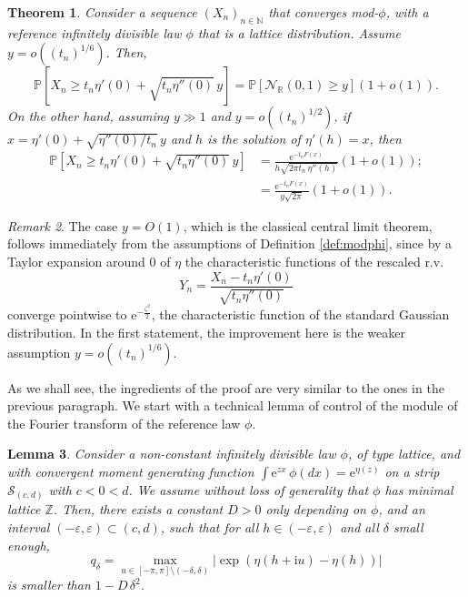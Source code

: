 \documentclass[12pt,a4paper,reqno]{amsart}
\newtheorem{lemma}{Lemma}[section]
\newtheorem{theorem}[lemma]{Theorem}
\theoremstyle{remark}
\newtheorem{remark}[lemma]{Remark}
\newcommand{\N}{\mathbb{N}}
\newcommand{\Z}{\mathbb{Z}}
\newcommand{\R}{\mathbb{R}}
\newcommand{\E}{\mathrm{e}}
\newcommand{\I}{\mathrm{i}}
\newcommand{\proba}{\mathbb{P}}
\newcommand{\eps}{\varepsilon}
\begin{document}
\begin{theorem}\label{thm:cltlattice}
Consider a sequence $(X_n)_{n \in \N}$ that converges mod-$\phi$, with a reference infinitely divisible law $\phi$ that is a lattice distribution. Assume $y=o((t_{n})^{1/6})$. Then,
$$\proba\!\left[X_{n}\geq t_{n}\eta'(0)+\sqrt{t_{n}\eta''(0)}\,y\right]=\proba[\mathcal{N}_{\R}(0,1)\geq y]\left(1+o(1)\right).$$
On the other hand, assuming $y \gg 1$ and $y=o((t_n)^{1/2})$, if $x=\eta'(0)+\sqrt{\eta''(0)/t_n}\,y$ and $h$ is the solution of $\eta'(h)=x$, then
\begin{align}
    \proba\!\left[X_{n}\geq t_{n}\eta'(0)+\sqrt{t_{n}\eta''(0)}\,y\right]
& = \frac{\E^{-t_n F(x)}}{h \sqrt{2\pi t_{n}\,\eta''(h)}}(1+o(1)) ; \nonumber\\
& = \frac{\E^{-t_n F(x)}}{y \sqrt{2\pi}} (1+o(1)).
\label{EqGaussianTailY}
\end{align}
\end{theorem}
\medskip

\begin{remark}
The case $y=O(1)$, which is the classical central limit theorem, follows immediately from the assumptions of Definition \ref{def:modphi}, since by a Taylor expansion around $0$ of $\eta$ the characteristic functions of the rescaled r.v. 
\[Y_{n}=\frac{X_{n}-t_{n}\eta'(0)}{\sqrt{t_{n}\eta''(0)}}\] 
converge pointwise to $\E^{-\frac{\zeta^{2}}{2}}$, the characteristic function of the standard Gaussian distribution.
In the first statement, the improvement here is the weaker assumption $y=o((t_{n})^{1/6})$.
\end{remark}\medskip

As we shall see, the ingredients of the proof are very similar to the ones in the previous paragraph. We start with a technical lemma of control of the module of the Fourier transform of the reference law $\phi$. 

\begin{lemma}\label{lem:technicqdelta_lattice}
Consider a non-constant infinitely divisible law $\phi$, of type lattice, and with convergent moment generating function $\int \E^{zx}\,\phi(dx) = \E^{\eta(z)}$ on a strip $\mathcal{S}_{(c,d)}$ with $c<0<d$. We assume without loss of generality that $\phi$ has minimal lattice $\Z$. Then, there exists a constant $D>0$ only depending on $\phi$, and an interval $(-\eps,\eps)\subset (c,d)$, such that for all $h \in (-\eps,\eps)$ and all $\delta$ small enough,
$$q_{\delta}= \max_{u \in [-\pi,\pi]\setminus (-\delta,\delta)} |\exp(\eta(h+\I u)-\eta(h))|$$ 
is smaller than $1-D\,\delta^{2}$.
\end{lemma}
\end{document}
